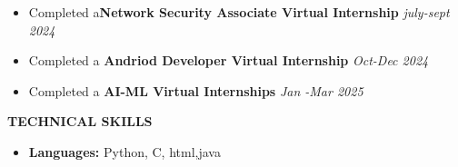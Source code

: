 \documentclass[a4paper,10pt]{article}
\newcommand{\lsep}{-0.5cm}
\newcommand{\resheading}[1]{{\small \colorbox{mygrey}{\begin{minipage}{0.975\textwidth}{\textbf{#1 \vphantom{p\^{E}}}}\end{minipage}}}}
\begin{document}
	
\begin{itemize}

\vspace{-0.5mm}

\item Completed a\textbf{Network Security Associate Virtual Internship} 
\textit{\hfill 
{july-sept 2024}
}



\vspace{-1.5mm}

\item Completed a \textbf{Andriod Developer Virtual Internship} 
\textit{\hfill 
{Oct-Dec 2024}
}



\vspace{-1.5mm}

\item Completed a  \textbf{AI-ML Virtual Internships} 
\textit{\hfill 
{Jan -Mar 2025}
}



\vspace{-1.5mm}
\end{itemize}



\resheading{\textbf{TECHNICAL SKILLS} }
\begin{itemize}
\vspace{-1mm}

\item \textbf{Languages:} Python, C, html,java

\vspace{-1mm}


\end{itemize}













\end{document}

